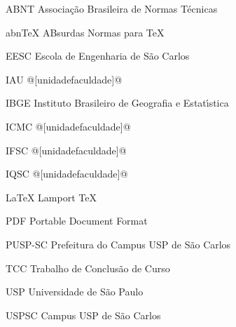 \begin{siglas}
    \item[ABNT] Associa\c{c}\~ao Brasileira de Normas T\'ecnicas
    \item[abnTeX] ABsurdas Normas para TeX
	\item[EESC] Escola de Engenharia de S\~ao Carlos
	\item[IAU] @[unidadefaculdade]@
	\item[IBGE] Instituto Brasileiro de Geografia e Estat\'{\i}stica
	\item[ICMC] @[unidadefaculdade]@
	\item[IFSC] @[unidadefaculdade]@
	\item[IQSC] @[unidadefaculdade]@
	\item[LaTeX] Lamport TeX
	\item[PDF] Portable Document Format
	\item[PUSP-SC] Prefeitura do Campus USP de S\~ao Carlos
	\item[TCC] Trabalho de Conclus\~ao de Curso
	\item[USP] Universidade de S\~ao Paulo
	\item[USPSC] Campus USP de S\~ao Carlos
\end{siglas}
